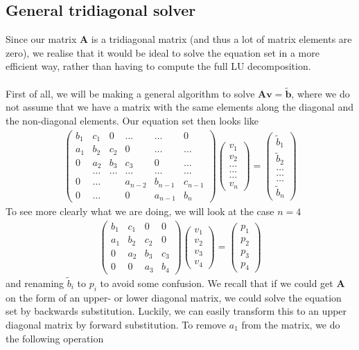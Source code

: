 \documentclass{article}
\newcommand\ppmat[1]{\begin{pmatrix}#1\end{pmatrix}}
\begin{document}
\subsection{General tridiagonal solver}
Since our matrix $\mathbf{A}$ is a tridiagonal matrix (and thus a lot of matrix elements are zero), we realise that it would be ideal to solve the equation set in a more efficient way, rather than having to compute the full LU decomposition.\\\\
First of all, we will be making a general algorithm to solve $\mathbf{A}\mathbf{v} = \mathbf{\tilde b}$, where we do not assume that we have a matrix with the same elements along the diagonal and the non-diagonal elements. Our equation set then looks like 
\begin{align*}
\ppmat{b_1&c_1&0&\dots&\dots&0\\a_1&b_2&c_2&0&\dots&\dots\\0&a_2&b_3&c_3&0&\dots\\&\dots&\dots&\dots&\dots&\dots\\0&\dots& &a_{n-2}&b_{n-1}&c_{n-1}\\
0&\dots& &0&a_{n-1}&b_n}\ppmat{v_1\\v_2\\\dots\\\dots\\\dots\\v_n} = \ppmat{\tilde b_1\\\tilde b_2\\\dots\\\dots\\\dots\\\tilde b_n}
\end{align*}
To see more clearly what we are doing, we will look at the case $n=4$
\begin{align*}
  \ppmat{b_1&c_1&0&0\\a_1&b_2&c_2&0\\0&a_2&b_3&c_3\\0&0&a_3&b_4}
  \ppmat{v_1\\v_2\\v_3\\v_4} = \ppmat{ p_1\\ p_2\\ p_3\\ p_4}
\end{align*}
and renaming $\tilde b_i$ to $p_i$ to avoid some confusion. We recall that if we could get $\mathbf{A}$ on the form of an upper- or lower diagonal matrix, we could solve the equation set by backwards substitution. Luckily, we can easily transform this to an upper diagonal matrix by forward substitution. To remove $a_1$ from the matrix, we do the following operation
\end{document}
